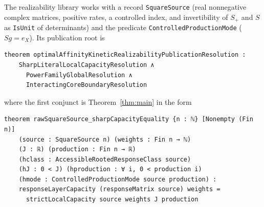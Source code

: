 \documentclass[11pt,reqno]{amsart}
\theoremstyle{plain}
\theoremstyle{definition}
\theoremstyle{remark}
\numberwithin{equation}{section}
\newcommand{\Sp}{S_{+}}
\begin{document}
The realizability library works with a record \texttt{SquareSource} (real nonnegative complex matrices, positive rates, a controlled index, and invertibility of $\Sp$ and $S$ as \texttt{IsUnit} of determinants) and the predicate \texttt{ControlledProductionMode} ($Sg=e_X$).  Its publication root is
\begin{lstlisting}
theorem optimalAffinityKineticRealizabilityPublicationResolution :
    SharpLiteralLocalCapacityResolution ∧
      PowerFamilyGlobalResolution ∧
      InteractingCoreBoundaryResolution
\end{lstlisting}
where the first conjunct is Theorem~\ref{thm:main} in the form
\begin{lstlisting}
theorem rawSquareSource_sharpCapacityEquality {n : ℕ} [Nonempty (Fin n)]
    (source : SquareSource n) (weights : Fin n → ℕ)
    (J : ℝ) (production : Fin n → ℝ)
    (hclass : AccessibleRootedResponseClass source)
    (hJ : 0 < J) (hproduction : ∀ i, 0 < production i)
    (hmode : ControlledProductionMode source production) :
    responseLayerCapacity (responseMatrix source) weights =
      strictLocalCapacity source weights J production
\end{lstlisting}
\end{document}
